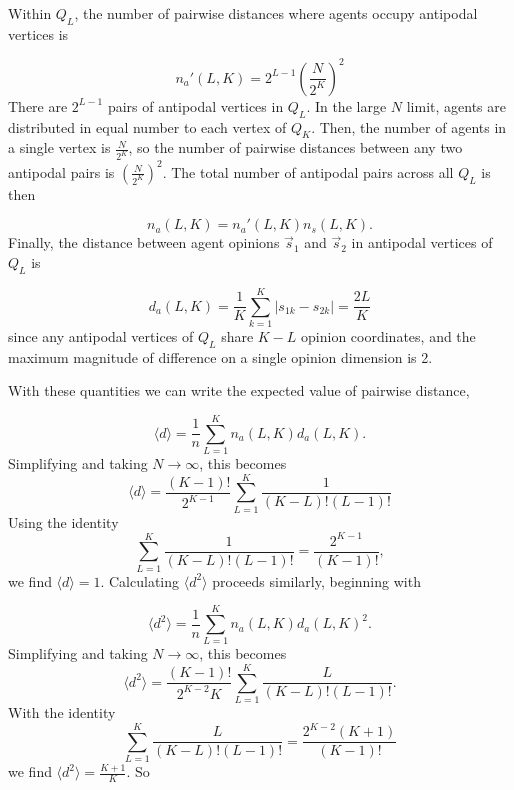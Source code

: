Within $Q_L$, the number of pairwise distances where agents occupy antipodal
vertices is 

\[
  n_a'(L, K) = 2^{L-1} \left(\frac{N}{2^K}\right)^2
\]
\noindent
There are $2^{L-1}$ pairs of antipodal vertices in $Q_L$. In the large
$N$ limit, agents are distributed in equal number to each vertex of $Q_K$.
Then, the number of agents in a single vertex is $\frac{N}{2^K}$, so the number
of pairwise distances between any two antipodal pairs is $\left(\frac{N}{2^K}\right)^2$.
The total number of antipodal pairs across all $Q_L$ is then

\begin{equation}
  n_a(L, K) = n_a'(L, K) n_s(L, K).
\end{equation}
\noindent
Finally, the distance between agent opinions $\vec s_1$ and
$\vec s_2$ in antipodal vertices of $Q_L$ is

\begin{equation}
  d_a(L, K) = \frac{1}{K} \sum_{k=1}^{K} |s_{1k} - s_{2k}| = \frac{2L}{K}
\end{equation}
\noindent
since any antipodal vertices of $Q_L$ share $K-L$ opinion coordinates, and the
maximum magnitude of difference on a single opinion dimension is 2. 

With these quantities we can write the expected value of pairwise distance,

\begin{equation}
  \langle d \rangle = \frac{1}{n} \sum_{L=1}^K n_a(L, K) d_a(L, K).
\end{equation}
\noindent
Simplifying and taking $N \rightarrow \infty$, this becomes
\[
  \langle d \rangle = \frac{(K-1)!}{2^{K-1}} \sum_{L=1}^K \frac{1}{(K-L)!(L-1)!}
\]
\noindent
Using the identity
\[
  \sum_{L=1}^K \frac{1}{(K-L)!(L-1)!} = \frac{2^{K-1}}{(K-1)!},
\]
\noindent
we find $\langle d \rangle = 1$. Calculating $\langle d^2 \rangle$ proceeds 
similarly, beginning with

\begin{equation}
  \langle d^2 \rangle = \frac{1}{n} \sum_{L=1}^K n_a(L, K) d_a(L, K)^2.
\end{equation}
\noindent
Simplifying and taking $N \rightarrow \infty$, this becomes
\[
  \langle d^2 \rangle = \frac{(K-1)!}{2^{K-2}K} \sum_{L=1}^K \frac{L}{(K-L)!(L-1)!}.
\]
\noindent
With the identity
\[
  \sum_{L=1}^K \frac{L}{(K-L)!(L-1)!} = \frac{2^{K-2}(K+1)}{(K-1)!}
\]
\noindent
we find $\langle d^2 \rangle = \frac{K+1}{K}$. So

